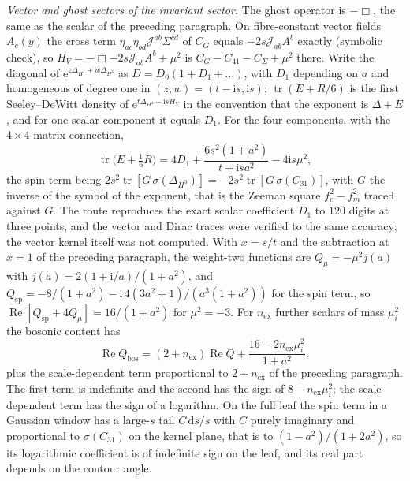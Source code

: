 \emph{Vector and ghost sectors of the invariant sector.} The ghost operator is \(-\Box\), the same as the scalar of the preceding paragraph. On fibre-constant vector fields \(A_c(y)\) the cross term \(\eta_{ac}\eta_{bd}\mathcal J^{ab}\Sigma^{cd}\) of \(C_G\) equals \(-2s\mathcal J_{ab}A^b\) exactly (symbolic check), so \(H_V=-\Box-2s\mathcal J_{ab}A^b+\mu^2\) is \(C_G-C_{41}-C_\Sigma+\mu^2\) there. Write the diagonal of \(\mathrm e^{z\Delta_{H^4}+w\Delta_{H^3}}\) as \(D=D_0(1+D_1+\dots)\), with \(D_1\) depending on \(a\) and homogeneous of degree one in \((z,w)=(t-\mathrm is,\mathrm is)\); \(\operatorname{tr}(E+R/6)\) is the first Seeley--DeWitt density of \(\mathrm e^{t\Delta_{H^4}-\mathrm isH_V}\) in the convention that the exponent is \(\Delta+E\), and for one scalar component it equals \(D_1\). For the four components, with the \(4\times4\) matrix connection,
\[
  \operatorname{tr}\bigl(E+\tfrac16R\bigr)=4D_1+\frac{6s^2(1+a^2)}{t+\mathrm isa^2}-4\mathrm is\mu^2 ,
\]
the spin term being \(2s^2\operatorname{tr}[G\,\sigma(\Delta_{H^3})]=-2s^2\operatorname{tr}[G\,\sigma(C_{31})]\), with \(G\) the inverse of the symbol of the exponent, that is the Zeeman square \(f_e^2-f_m^2\) traced against \(G\). The route reproduces the exact scalar coefficient \(D_1\) to \(120\) digits at three points, and the vector and Dirac traces were verified to the same accuracy; the vector kernel itself was not computed. With \(x=s/t\) and the subtraction at \(x=1\) of the preceding paragraph, the weight-two functions are \(Q_\mu=-\mu^2j(a)\) with \(j(a)=2(1+\mathrm i/a)/(1+a^2)\), and \(Q_{\mathrm{sp}}=-8/(1+a^2)-\mathrm i\,4(3a^2+1)/(a^3(1+a^2))\) for the spin term, so \(\operatorname{Re}[Q_{\mathrm{sp}}+4Q_{\mu}]=16/(1+a^2)\) for \(\mu^2=-3\). For \(n_{\mathrm{ex}}\) further scalars of mass \(\mu_i^2\) the bosonic content has
\[
  \operatorname{Re}Q_{\mathrm{bos}}=(2+n_{\mathrm{ex}})\operatorname{Re}Q+\frac{16-2n_{\mathrm{ex}}\mu_i^2}{1+a^2},
\]
plus the scale-dependent term proportional to \(2+n_{\mathrm{ex}}\) of the preceding paragraph. The first term is indefinite and the second has the sign of \(8-n_{\mathrm{ex}}\mu_i^2\); the scale-dependent term has the sign of a logarithm. On the full leaf the spin term in a Gaussian window has a large-\(s\) tail \(C\,\mathrm ds/s\) with \(C\) purely imaginary and proportional to \(\sigma(C_{31})\) on the kernel plane, that is to \((1-a^2)/(1+2a^2)\), so its logarithmic coefficient is of indefinite sign on the leaf, and its real part depends on the contour angle.

